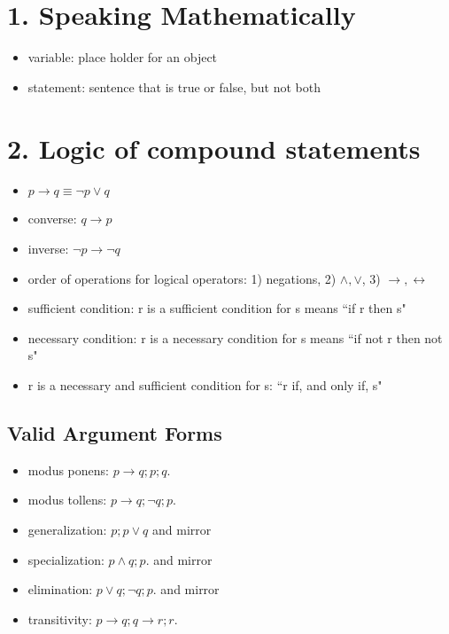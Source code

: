 \documentclass[8pt,landscape]{article}
\begin{document}
	\small 
	\begin{multicols*}{4}
		\section*{1. Speaking Mathematically}
		\begin{itemize}[leftmargin=*]
			\item variable: place holder for an object
			\item statement: sentence that is true or false, but not both
		\end{itemize}
		\section*{2. Logic of compound statements}
		\begin{itemize}[leftmargin=*]
			\item $p\rightarrow q \equiv \neg p \lor q$
			\item converse: $ q\rightarrow p$
			\item inverse: $\neg p \rightarrow \neg q$
			\item order of operations for logical operators: 1) negations, 2) $\land, \lor$, 3) $\longrightarrow, \longleftrightarrow$
			\item sufficient condition: r is a sufficient condition for s means ``if r then s"
			\item necessary condition: r is a necessary condition for s means ``if not r then not s"
			\item r is a necessary and sufficient condition for s: ``r if, and only if, s"
		\end{itemize}
		\subsection*{Valid Argument Forms}
		\begin{itemize}[leftmargin=*]
			\item modus ponens: $p\rightarrow q;p;q.$
			\item modus tollens: $p\rightarrow q;\neg q;p.$
			\item generalization: $p;p\lor q$ and mirror
			\item specialization: $p\land q;p.$ and mirror
			\item elimination: $p\lor q;\neg q;p.$ and mirror
			\item transitivity: $p\rightarrow q;q\rightarrow r;r.$
		\end{itemize}


\end{multicols*}
\end{document}
